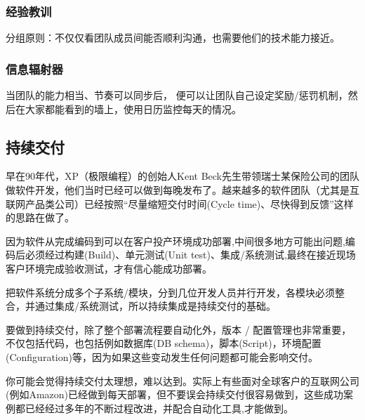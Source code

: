 \hypertarget{ux7ecfux9a8cux6559ux8bad}{%
\subsubsection{经验教训}\label{ux7ecfux9a8cux6559ux8bad}}

分组原则：不仅仅看团队成员间能否顺利沟通，也需要他们的技术能力接近。

\hypertarget{ux4fe1ux606fux8f90ux5c04ux5668}{%
\subsubsection{信息辐射器}\label{ux4fe1ux606fux8f90ux5c04ux5668}}

当团队的能力相当、节奏可以同步后，
便可以让团队自己设定奖励/惩罚机制，然后在大家都能看到的墙上，使用日历监控每天的情况。


\hypertarget{ux6301ux7eedux4ea4ux4ed8}{%
\subsection{持续交付}\label{ux6301ux7eedux4ea4ux4ed8}}

早在90年代，XP（极限编程）的创始人Kent
Beck先生带领瑞士某保险公司的团队做软件开发，他们当时已经可以做到每晚发布了。越来越多的软件团队（尤其是互联网产品类公司）已经按照``尽量缩短交付时间(Cycle
time)、尽快得到反馈''这样的思路在做了。

因为软件从完成编码到可以在客户投产环境成功部署,中间很多地方可能出问题,编码后必须经过构建(Build)、单元测试(Unit
test)、集成/系统测试,最终在接近现场客户环境完成验收测试，才有信心能成功部署。

把软件系统分成多个子系统/模块，分到几位开发人员并行开发，各模块必须整合，并通过集成/系统测试，所以持续集成是持续交付的基础。

要做到持续交付，除了整个部署流程要自动化外，版本 /
配置管理也非常重要，不仅包括代码，也包括例如数据库(DB
schema)，脚本(Script)，环境配置(Configuration)等，因为如果这些变动发生任何问题都可能会影响交付。

你可能会觉得持续交付太理想，难以达到。实际上有些面对全球客户的互联网公司(例如Amazon)已经做到每天部署，但不要误会持续交付很容易做到，这些成功案例都已经经过多年的不断过程改进，并配合自动化工具,才能做到。

